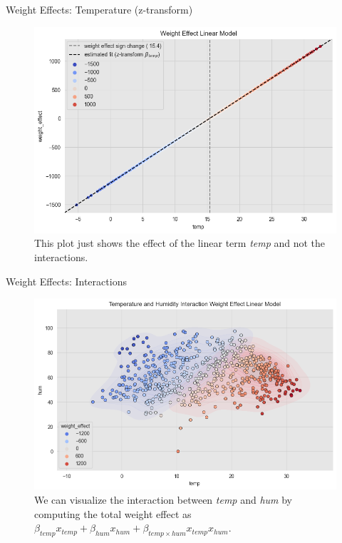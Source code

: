 \documentclass[10pt]{beamer}
\begin{document}
\begin{frame}{Weight Effects: Temperature (z-transform)}
\begin{center}
  \begin{figure}
    \includegraphics[scale=0.48]{images/interpretable_ml_65_0.png}
    \caption{This plot just shows the effect of the linear term {\em temp} and not the interactions.}
  \end{figure}
\end{center}
\end{frame}

\begin{frame}{Weight Effects: Interactions}
\begin{center}
  \begin{figure}
    \includegraphics[scale=0.48]{images/interpretable_ml_68_0.png}
    \caption{
      We can visualize the interaction between {\em temp} and {\em hum} by computing the total weight effect as $\beta_{temp}x_{temp} + \beta_{hum}x_{hum} + \beta_{temp \times hum}x_{temp}x_{hum}$.
    }
  \end{figure}
\end{center}
\end{frame}
\end{document}
